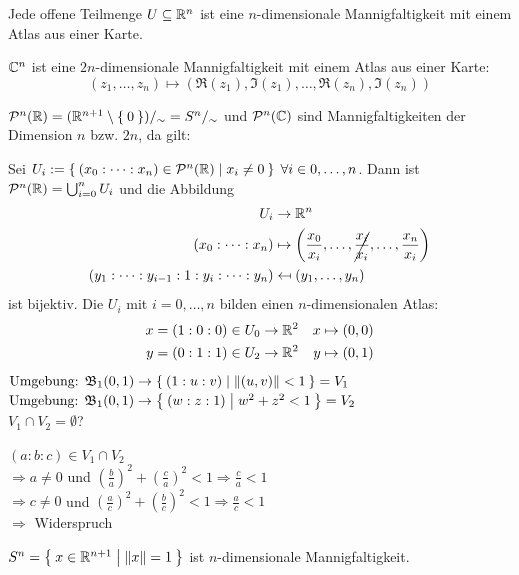 \begin{beispiel}[Mannigfaltigkeiten]
    \begin{bspenum}
        \item Jede offene Teilmenge $U \subseteq \mathbb{R}^n$ ist eine 
              $n$-dimensionale Mannigfaltigkeit mit einem Atlas aus 
              einer Karte.
        \item $\mathbb{C}^n$ ist eine $2n$-dimensionale Mannigfaltigkeit
              mit einem Atlas aus einer Karte:
              \[(z_1, \dots, z_n) \mapsto (\Re(z_1), \Im(z_1), \dots, \Re(z_n), \Im(z_n))\]
        \item {}$\mathcal{P}^n(\mathbb{R}) = (\mathbb{R}^{n+1} \setminus \Set{0})/_\sim = S^n /_\sim$ und $\mathcal{P}^n(\mathbb{C})$ sind Mannigfaltigkeiten
              der Dimension $n$ bzw. $2n$, da gilt:

              Sei $U_i := \Set{(x_0: \dots : x_n) \in \ensuremath{\mathcal{P}}^n(\ensuremath{\mathbb{R}}) | x_i \neq 0}\;\forall i \in 0, \dots, n$.
              Dann ist $\mathcal{P}^n(\mathbb{R}) = \bigcup_{i=0}^n U_i$ und die Abbildung
              \begin{align*}
                U_i &\rightarrow \mdr^n\\
                (x_0 : \dots : x_n) &\mapsto \left (\frac{x_0}{x_i}, \dots, \cancel{\frac{x_i}{x_i}}, \dots, \frac{x_n}{x_i} \right )\\
                (y_1 : \dots : y_{i-1} : 1 : y_i : \dots : y_n) &\mapsfrom (y_1, \dots, y_n)
              \end{align*}
              ist bijektiv.
              Die $U_i$ mit $i = 0, \dots, n$ bilden einen $n$-dimensionalen Atlas:
              \begin{align*}
                      x &= (1:0:0) \in U_0 \rightarrow \mathbb{R}^2 & x &\mapsto (0,0)\\
                      y &= (0:1:1) \in U_2 \rightarrow \mathbb{R}^2 & y &\mapsto (0,1)
              \end{align*}
              $\text{Umgebung: } \mathfrak{B}_1 (0,1) \rightarrow \Set{(1:u:v) | \|(u,v)\| < 1} = V_1$\\
              $\text{Umgebung: } \mathfrak{B}_1 (0,1) \rightarrow \Set{(w:z:1) | w^2 + z^2 < 1} = V_2$\\

              $V_1 \cap V_2 = \emptyset$?

              $(a:b:c) \in V_1 \cap V_2$\\
              $\Rightarrow a \neq 0$ und $(\frac{b}{a})^2 + (\frac{c}{a})^2 < 1 \Rightarrow \frac{c}{a} < 1$\\
              $\Rightarrow c \neq 0$ und $(\frac{a}{c})^2 + (\frac{b}{c})^2 < 1 \Rightarrow \frac{a}{c} < 1$\\
              $\Rightarrow$ Widerspruch
        \item $S^n = \Set{x \in \ensuremath{\mathbb{R}}^{n+1} | \|x\| = 1}$ ist $n$-dimensionale
              Mannigfaltigkeit.


\end{bspenum}
\end{beispiel}

